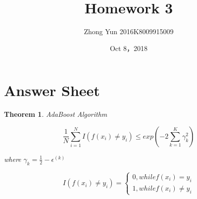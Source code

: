 \documentclass{article} %
\title{Homework 3}
\author{Zhong Yun 2016K8009915009}
\date{Oct 8，2018}
\newtheorem{theorem}{Theorem}
\begin{document}
\maketitle
%


% 
%

\section{Answer Sheet}
\begin{theorem}AdaBoost Algorithm

$$\frac{1}{N}\sum_{i=1}^NI(f(x_i)\neq y_i)\leq exp(-2\sum_{k=1}^K\gamma_k^2)$$

where $\gamma_k=\frac{1}{2}-\epsilon^{(k)}$

$$ I(f(x_i)\neq y_i)=\left\{
\begin{aligned}
0,while f(x_i)=y_i \\
1,while f(x_i)\neq y_i
\end{aligned}
\right.
$$
\end{theorem}
\end{document}
